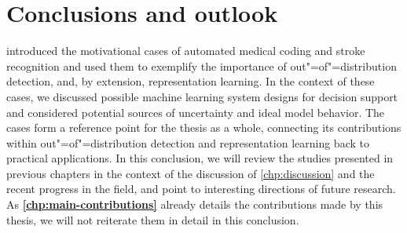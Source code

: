 
\chapter[conclusions and outlook]{Conclusions and outlook}\label{chp:conclusion}

\textbf{} introduced the motivational cases of automated medical coding and stroke recognition and used them to exemplify the importance of out"=of"=distribution detection, and, by extension, representation learning. In the context of these cases, we discussed possible machine learning system designs for decision support and considered potential sources of uncertainty and ideal model behavior. 
The cases form a reference point for the thesis as a whole, connecting its contributions within out"=of"=distribution detection and representation learning back to practical applications. 
In this conclusion, we will review the studies presented in previous chapters in the context of the discussion of \cref{chp:discussion} and the recent progress in the field, and point to interesting directions of future research. 
As \textbf{\cref{chp:main-contributions}} already details the contributions made by this thesis, we will not reiterate them in detail in this conclusion. 



